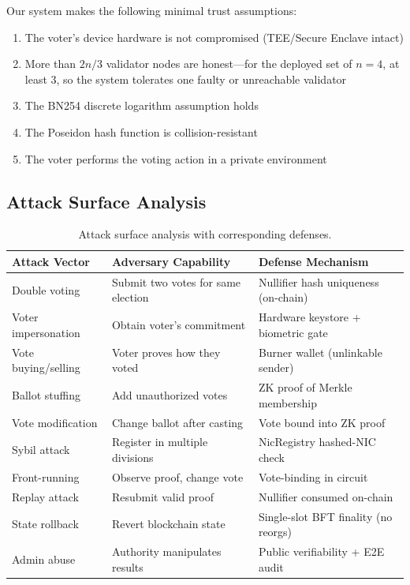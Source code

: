 Our system makes the following minimal trust assumptions:
\begin{enumerate}
    \item The voter's device hardware is not compromised (TEE/Secure Enclave intact)
    \item More than $2n/3$ validator nodes are honest---for the deployed set of $n=4$, at least $3$, so the system tolerates one faulty or unreachable validator
    \item The BN254 discrete logarithm assumption holds
    \item The Poseidon hash function is collision-resistant
    \item The voter performs the voting action in a private environment
\end{enumerate}

\subsection{Attack Surface Analysis}

\begin{table}[H]
\centering
\caption{Attack surface analysis with corresponding defenses.}
\label{tab:attack-surface}
\begin{tabular}{|p{3cm}|p{4cm}|p{5cm}|}
\hline
\textbf{Attack Vector} & \textbf{Adversary Capability} & \textbf{Defense Mechanism} \\
\hline
Double voting & Submit two votes for same election & Nullifier hash uniqueness (on-chain) \\
\hline
Voter impersonation & Obtain voter's commitment & Hardware keystore + biometric gate \\
\hline
Vote buying/selling & Voter proves how they voted & Burner wallet (unlinkable sender) \\
\hline
Ballot stuffing & Add unauthorized votes & ZK proof of Merkle membership \\
\hline
Vote modification & Change ballot after casting & Vote bound into ZK proof \\
\hline
Sybil attack & Register in multiple divisions & NicRegistry hashed-NIC check \\
\hline
Front-running & Observe proof, change vote & Vote-binding in circuit \\
\hline
Replay attack & Resubmit valid proof & Nullifier consumed on-chain \\
\hline
State rollback & Revert blockchain state & Single-slot BFT finality (no reorgs) \\
\hline
Admin abuse & Authority manipulates results & Public verifiability + E2E audit \\
\hline
\end{tabular}
\end{table}

